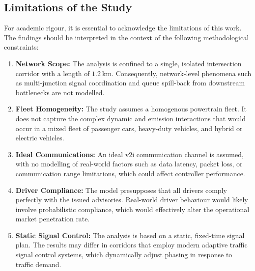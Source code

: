 \subsection*{Limitations of the Study}
For academic rigour, it is essential to acknowledge the limitations of this work. The findings should be interpreted in the context of the following methodological constraints:
\begin{enumerate}
    \item \textbf{Network Scope:} The analysis is confined to a single, isolated intersection corridor with a length of $1.2~\unit{\kilo\metre}$. Consequently, network-level phenomena such as multi-junction signal coordination and queue spill-back from downstream bottlenecks are not modelled.

    \item \textbf{Fleet Homogeneity:} The study assumes a homogenous powertrain fleet. It does not capture the complex dynamic and emission interactions that would occur in a mixed fleet of passenger cars, heavy-duty vehicles, and hybrid or electric vehicles.

    \item \textbf{Ideal Communications:} An ideal \ac{v2i} communication channel is assumed, with no modelling of real-world factors such as data latency, packet loss, or communication range limitations, which could affect controller performance.

    \item \textbf{Driver Compliance:} The model presupposes that all drivers comply perfectly with the issued advisories. Real-world driver behaviour would likely involve probabilistic compliance, which would effectively alter the operational market penetration rate.

    \item \textbf{Static Signal Control:} The analysis is based on a static, fixed-time signal plan. The results may differ in corridors that employ modern adaptive traffic signal control systems, which dynamically adjust phasing in response to traffic demand.
\end{enumerate}

